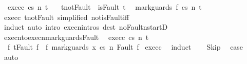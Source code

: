 \begin{isabellebody}
\ \ exec{\isacharunderscore}c{\isacharcolon}\ {\isachardoublequoteopen}{\isasymGamma}{\isasymturnstile}{\isasymlangle}c{\isacharcomma}s{\isasymrangle}\ {\isacharequal}n{\isasymRightarrow}\ t{\isachardoublequoteclose}\ \isanewline
\ \ t{\isacharunderscore}not{\isacharunderscore}Fault{\isacharcolon}\ {\isachardoublequoteopen}{\isasymnot}\ isFault\ t{\isachardoublequoteclose}\isanewline
\ \ {\isachardoublequoteopen}{\isasymGamma}{\isasymturnstile}{\isasymlangle}mark{\isacharunderscore}guards\ f\ c{\isacharcomma}s{\isasymrangle}\ {\isacharequal}n{\isasymRightarrow}\ t\ {\isachardoublequoteclose}\isanewline
%
\isadelimproof
%
\endisadelimproof
%
\isatagproof
{}\isamarkupfalse%
\ exec{\isacharunderscore}c\ t{\isacharunderscore}not{\isacharunderscore}Fault\ {\isacharbrackleft}simplified\ not{\isacharunderscore}isFault{\isacharunderscore}iff{\isacharbrackright}\isanewline
{}\isamarkupfalse%
\ {\isacharparenleft}induct{\isacharparenright}\ {\isacharparenleft}auto\ intro{\isacharcolon}\ execn{\isachardot}intros\ dest{\isacharcolon}\ noFaultn{\isacharunderscore}startD{\isacharprime}{\isacharparenright}%
\endisatagproof
{\isafoldproof}%
%
\isadelimproof
\isanewline
%
\endisadelimproof
\isanewline
{}\isamarkupfalse%
\ execn{\isacharunderscore}to{\isacharunderscore}execn{\isacharunderscore}mark{\isacharunderscore}guards{\isacharunderscore}Fault{\isacharcolon}\isanewline
\ \ exec{\isacharunderscore}c{\isacharcolon}\ {\isachardoublequoteopen}{\isasymGamma}{\isasymturnstile}{\isasymlangle}c{\isacharcomma}s{\isasymrangle}\ {\isacharequal}n{\isasymRightarrow}\ t{\isachardoublequoteclose}\isanewline
\ \ {\isachardoublequoteopen}{\isasymAnd}f{\isachardot}\ {\isasymlbrakk}t{\isacharequal}Fault\ f{\isasymrbrakk}\ {\isasymLongrightarrow}\ {\isasymexists}f{\isacharprime}{\isachardot}\ {\isasymGamma}{\isasymturnstile}{\isasymlangle}mark{\isacharunderscore}guards\ x\ c{\isacharcomma}s{\isasymrangle}\ {\isacharequal}n{\isasymRightarrow}\ Fault\ f{\isacharprime}{\isachardoublequoteclose}\isanewline
%
\isadelimproof
%
\endisadelimproof
%
\isatagproof
{}\isamarkupfalse%
\ exec{\isacharunderscore}c\ \isanewline
{}\isamarkupfalse%
\ {\isacharparenleft}induct{\isacharparenright}\isanewline
\ \ \isamarkupfalse%
\ Skip\ \isamarkupfalse%
\ {\isacharquery}case\ \isamarkupfalse%
\ auto\isanewline
{}\isamarkupfalse%
\isanewline
\ \ \isamarkupfalse%

\end{isabellebody}
